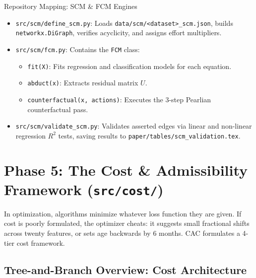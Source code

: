 \documentclass[11pt,a4paper]{article}
\begin{document}
\begin{codeanatomy}{Repository Mapping: SCM \& FCM Engines}
\begin{itemize}[leftmargin=1.2em]
    \item \texttt{src/scm/define\_scm.py}: Loads \texttt{data/scm/<dataset>\_scm.json}, builds \texttt{networkx.DiGraph}, verifies acyclicity, and assigns effort multipliers.
    \item \texttt{src/scm/fcm.py}: Contains the \texttt{FCM} class:
    \begin{itemize}
        \item \texttt{fit(X)}: Fits regression and classification models for each equation.
        \item \texttt{abduct(x)}: Extracts residual matrix $U$.
        \item \texttt{counterfactual(x, actions)}: Executes the 3-step Pearlian counterfactual pass.
    \end{itemize}
    \item \texttt{src/scm/validate\_scm.py}: Validates asserted edges via linear and non-linear regression $R^2$ tests, saving results to \texttt{paper/tables/scm\_validation.tex}.
\end{itemize}
\end{codeanatomy}

\newpage
\section{Phase 5: The Cost \& Admissibility Framework (\texttt{src/cost/})}
\label{sec:phase5}

In optimization, algorithms minimize whatever loss function they are given. If cost is poorly formulated, the optimizer cheats: it suggests small fractional shifts across twenty features, or sets age backwards by 6 months. CAC formulates a 4-tier cost framework.

\subsection{Tree-and-Branch Overview: Cost Architecture}
\end{document}
